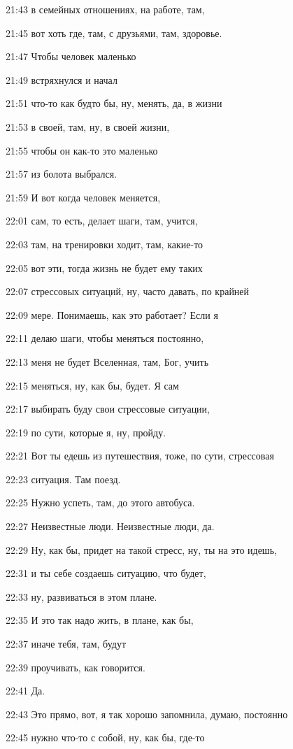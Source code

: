 21:43
в семейных отношениях, на работе, там,

21:45
вот хоть где, там, с друзьями, там, здоровье.

21:47
Чтобы человек маленько

21:49
встряхнулся и начал

21:51
что-то как будто бы, ну, менять, да, в жизни

21:53
в своей, там, ну, в своей жизни,

21:55
чтобы он как-то это маленько

21:57
из болота выбрался.

21:59
И вот когда человек меняется,

22:01
сам, то есть, делает шаги, там, учится,

22:03
там, на тренировки ходит, там, какие-то

22:05
вот эти, тогда жизнь не будет ему таких

22:07
стрессовых ситуаций, ну, часто давать, по крайней

22:09
мере. Понимаешь, как это работает? Если я

22:11
делаю шаги, чтобы меняться постоянно,

22:13
меня не будет Вселенная, там, Бог, учить

22:15
меняться, ну, как бы, будет. Я сам

22:17
выбирать буду свои стрессовые ситуации,

22:19
по сути, которые я, ну, пройду.

22:21
Вот ты едешь из путешествия, тоже, по сути, стрессовая

22:23
ситуация. Там поезд.

22:25
Нужно успеть, там, до этого автобуса.

22:27
Неизвестные люди. Неизвестные люди, да.

22:29
Ну, как бы, придет на такой стресс, ну, ты на это идешь,

22:31
и ты себе создаешь ситуацию, что будет,

22:33
ну, развиваться в этом плане.

22:35
И это так надо жить, в плане, как бы,

22:37
иначе тебя, там, будут

22:39
проучивать, как говорится.

22:41
Да.

22:43
Это прямо, вот, я так хорошо запомнила, думаю, постоянно

22:45
нужно что-то с собой, ну, как бы, где-то

